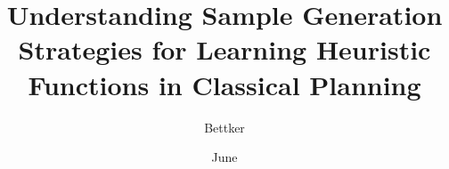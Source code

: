 \documentclass[docs/ppgc,docs/diss,english]{iiufrgs}
\title{Understanding Sample Generation Strategies for Learning Heuristic Functions in Classical Planning}
\author{Bettker}{Rafael Vales}
\date{June}{2023}
\begin{document}
\maketitle








\listoffigures
\listoftables
\listofalgorithms

\tableofcontents












\end{document}

